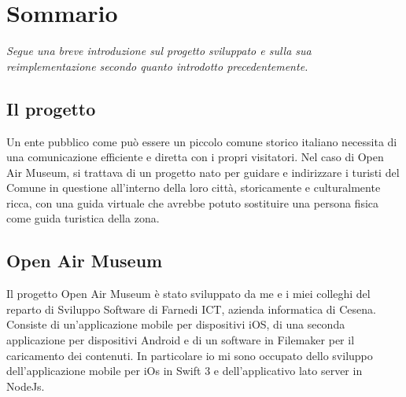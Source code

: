 \chapter*{Sommario} %
\label{sommario}

\vspace{5mm}

\emph{Segue una breve introduzione sul progetto sviluppato e sulla sua reimplementazione secondo quanto introdotto precedentemente.} \vspace{5mm}

\section{Il progetto}\vspace{5mm}

Un ente pubblico come può essere un piccolo comune storico italiano necessita di una comunicazione efficiente e diretta con i propri visitatori. Nel caso di Open Air Museum, si trattava di un progetto nato per guidare e indirizzare i turisti del Comune in questione all’interno della loro città, storicamente e culturalmente ricca, con una guida virtuale che avrebbe potuto sostituire una persona fisica come guida turistica della zona.  

\section{Open Air Museum}\vspace{5mm}

Il progetto Open Air Museum è stato sviluppato da me e i miei colleghi del reparto di Sviluppo Software di Farnedi ICT, azienda informatica di Cesena. Consiste di un’applicazione mobile per dispositivi iOS, di una seconda applicazione per dispositivi Android e di un software in Filemaker per il caricamento dei contenuti. In particolare io mi sono occupato dello sviluppo dell’applicazione mobile per iOs in Swift 3 e dell’applicativo lato server in NodeJs. \vspace{5mm}

